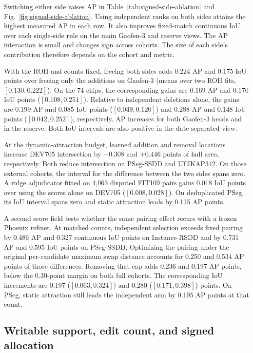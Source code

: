 \documentclass[journal]{IEEEtran}
\begin{document}
Switching either side raises AP in Table~\ref{tab:signed-side-ablation} and Fig.~\ref{fig:signed-side-ablation}. Using independent ranks on both sides attains the highest measured AP in each row. It also improves fixed-match continuous IoU over each single-side rule on the main Gaofen-3 and reserve views. The AP interaction is small and changes sign across cohorts. The size of each side's contribution therefore depends on the cohort and metric.

With the ROH and counts fixed, freeing both sides adds 0.224 AP and 0.175 IoU points over freeing only the additions on Gaofen-3 (means over two ROH fits, \([0.130,0.222]\)). On the 74 chips, the corresponding gains are 0.169 AP and 0.170 IoU points (\([0.108,0.251]\)). Relative to independent deletions alone, the gains are 0.199 AP and 0.085 IoU points (\([0.049,0.120]\)) and 0.288 AP and 0.148 IoU points (\([0.042,0.252]\)), respectively. AP increases for both Gaofen-3 heads and in the reserve. Both IoU intervals are also positive in the date-separated view.

At the dynamic-attraction budget, learned addition and removal locations increase DEV705 intersection by \(+0.308\) and \(+0.446\) points of hull area, respectively. Both reduce intersection on PSeg-SSDD and UEIKAP342. On those external cohorts, the interval for the difference between the two sides spans zero. A \href{https://github.com/bingzhi495-creator/SAR-SEAL-research/blob/3f8f738/research_round_20260925_global/ATTRACTION_LOCAL_CORRECTION_ACTUAL_20261123.md}{ridge adjudicator} fitted on 4,063 disputed FIT109 pairs gains 0.018 IoU points over using the scores alone on DEV705 (\([0.008,0.028]\)). On deduplicated PSeg, its IoU interval spans zero and static attraction leads by 0.115 AP points.

A second score field tests whether the same pairing effect recurs with a frozen Phoenix refiner. At matched counts, independent selection exceeds fixed pairing by 0.486 AP and 0.327 continuous IoU points on Instance-RSDD and by 0.731 AP and 0.595 IoU points on PSeg-SSDD. Optimizing the pairing under the original per-candidate maximum swap distance accounts for 0.250 and 0.534 AP points of those differences. Removing that cap adds 0.236 and 0.197 AP points, below the 0.30-point margin on both full cohorts. The corresponding IoU increments are 0.197 (\([0.063,0.324]\)) and 0.280 (\([0.171,0.398]\)) points. On PSeg, static attraction still leads the independent arm by 0.195 AP points at that count.

\subsection{Writable support, edit count, and signed allocation}
\end{document}

